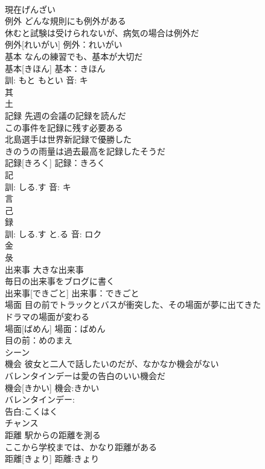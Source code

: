 \documentclass[8pt]{extreport}
\begin{document}
\begin{CJK}{UTF8}{min}
\\	現在げんざい
\\	例外	どんな規則にも例外がある 
\\	休むと試験は受けられないが、病気の場合は例外だ 
\\	例外[れいがい]			例外：れいがい
\\	基本	なんの練習でも、基本が大切だ 
\\	基本[きほん]			基本：きほん
\\	訓: もと もとい 音: キ 
\\	其 
\\	土 
\\	記録	先週の会議の記録を読んだ 
\\	この事件を記録に残す必要ある 
\\	北島選手は世界新記録で優勝した 
\\	きのうの雨量は過去最高を記録したそうだ 
\\	記録[きろく]			記録：きろく
\\	記 
\\	訓: しる.す 音: キ 
\\	言 
\\	己 
\\	録 
\\	訓: しる.す と.る 音: ロク 
\\	金 
\\	彔 
\\	出来事	大きな出来事 
\\	毎日の出来事をブログに書く 
\\	出来事[できごと]			出来事：できごと
\\	場面	目の前でトラックとバスが衝突した、その場面が夢に出てきた 
\\	ドラマの場面が変わる 
\\	場面[ばめん]			場面：ばめん
\\	目の前：めのまえ
\\	シーン 
\\	機会	彼女と二人で話したいのだが、なかなか機会がない 
\\	バレンタインデーは愛の告白のいい機会だ 
\\	機会[きかい]			機会:きかい
\\	バレンタインデー:
\\	告白:こくはく
\\	チャンス 
\\	距離	駅からの距離を測る 
\\	ここから学校までは、かなり距離がある 
\\	距離[きょり]			距離:きょり

\end{CJK}
\end{document}
